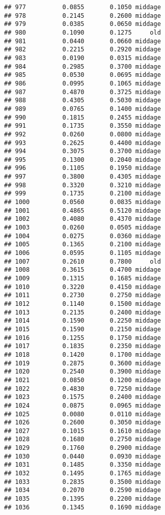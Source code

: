 \documentclass[
]{article}
\begin{document}
\begin{verbatim}
## 977          0.0855       0.1050 middage
## 978          0.2145       0.2600 middage
## 979          0.0385       0.0650 middage
## 980          0.1090       0.1275     old
## 981          0.0440       0.0660 middage
## 982          0.2215       0.2920 middage
## 983          0.0190       0.0315 middage
## 984          0.2985       0.3700 middage
## 985          0.0530       0.0695 middage
## 986          0.0995       0.1065 middage
## 987          0.4870       0.3725 middage
## 988          0.4305       0.5030 middage
## 989          0.0765       0.1400 middage
## 990          0.1815       0.2455 middage
## 991          0.1735       0.3550 middage
## 992          0.0260       0.0800 middage
## 993          0.2625       0.4400 middage
## 994          0.3075       0.3700 middage
## 995          0.1300       0.2040 middage
## 996          0.1105       0.1950 middage
## 997          0.3800       0.4305 middage
## 998          0.3320       0.3210 middage
## 999          0.1735       0.2100 middage
## 1000         0.0560       0.0835 middage
## 1001         0.4865       0.5120 middage
## 1002         0.4080       0.4370 middage
## 1003         0.0260       0.0505 middage
## 1004         0.0275       0.0360 middage
## 1005         0.1365       0.2100 middage
## 1006         0.0595       0.1105 middage
## 1007         0.2610       0.7800     old
## 1008         0.3615       0.4700 middage
## 1009         0.1315       0.1685 middage
## 1010         0.3220       0.4150 middage
## 1011         0.2730       0.2750 middage
## 1012         0.1140       0.1500 middage
## 1013         0.2135       0.2400 middage
## 1014         0.1590       0.2250 middage
## 1015         0.1590       0.2150 middage
## 1016         0.1255       0.1750 middage
## 1017         0.1835       0.2350 middage
## 1018         0.1420       0.1700 middage
## 1019         0.2875       0.3600 middage
## 1020         0.2540       0.3900 middage
## 1021         0.0850       0.1200 middage
## 1022         0.4830       0.7250 middage
## 1023         0.1575       0.2400 middage
## 1024         0.0875       0.0965 middage
## 1025         0.0080       0.0110 middage
## 1026         0.2600       0.3050 middage
## 1027         0.1015       0.1610 middage
## 1028         0.1680       0.2750 middage
## 1029         0.1760       0.2900 middage
## 1030         0.0440       0.0930 middage
## 1031         0.1485       0.3350 middage
## 1032         0.1495       0.1765 middage
## 1033         0.2835       0.3500 middage
## 1034         0.2070       0.2590 middage
## 1035         0.1395       0.2200 middage
## 1036         0.1345       0.1690 middage

\end{verbatim}
\end{document}
